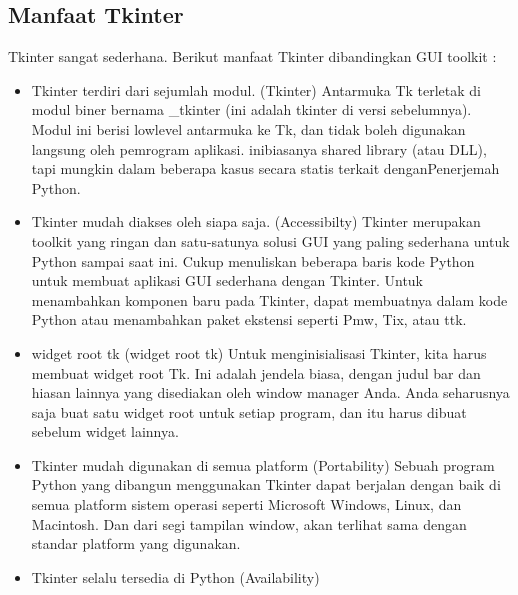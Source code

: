 \documentclass [12pt,a4paper,notitlepage,oneside,bahasa]{article}
\begin{document}
\begin{enumerate}
\begin{itemize}
\section{Manfaat Tkinter} \par
Tkinter sangat sederhana. Berikut manfaat Tkinter dibandingkan GUI toolkit : \par
\noindent 
\begin{itemize}
	\item Tkinter terdiri dari sejumlah modul.  (Tkinter)\vspace{\baselineskip}
	Antarmuka Tk terletak di modul biner bernama _tkinter (ini adalah tkinter di versi sebelumnya). Modul ini berisi lowlevel antarmuka ke Tk, dan tidak boleh digunakan langsung oleh pemrogram aplikasi. inibiasanya shared library (atau DLL), tapi mungkin dalam beberapa kasus secara statis terkait denganPenerjemah Python. \par
\noindent
	\item Tkinter mudah diakses oleh siapa saja. (Accessibilty)\vspace{\baselineskip}
	Tkinter merupakan toolkit yang ringan dan satu-satunya solusi GUI yang paling sederhana untuk Python sampai saat ini. Cukup menuliskan beberapa baris kode Python untuk membuat aplikasi GUI sederhana dengan Tkinter. Untuk menambahkan komponen baru pada Tkinter, dapat membuatnya dalam kode Python atau menambahkan paket ekstensi seperti Pmw, Tix, atau ttk. \par
\noindent 
	\item widget root tk (widget root tk)\vspace{\baselineskip}
	Untuk menginisialisasi Tkinter, kita harus membuat widget root Tk. Ini adalah jendela biasa, dengan judul bar dan hiasan lainnya yang disediakan oleh window manager Anda. Anda seharusnya saja buat satu widget root untuk setiap program, dan itu harus dibuat sebelum widget lainnya. \par
\noindent 
	\item Tkinter mudah digunakan di semua platform (Portability)\vspace{\baselineskip}
	Sebuah program Python yang dibangun menggunakan Tkinter dapat berjalan dengan baik di semua platform sistem operasi seperti Microsoft Windows, Linux, dan Macintosh. Dan dari segi tampilan window, akan terlihat sama dengan standar platform yang digunakan. \par
\noindent 
	\item Tkinter selalu tersedia di Python (Availability)\vspace{\baselineskip}

\end{itemize}
\end{itemize}
\end{enumerate}
\end{document}

